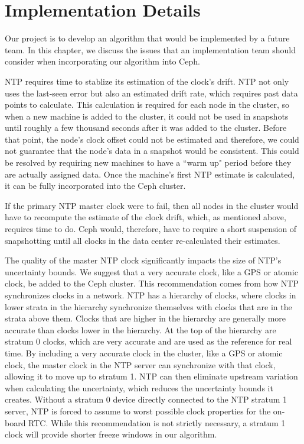 \chapter{Implementation Details}
\label{sec:impl}

Our project is to develop an algorithm that would be implemented by a future
team. In this chapter, we discuss the issues that an implementation 
team should consider when incorporating our algorithm into Ceph.

NTP requires time to stablize its estimation of the clock's drift. 
NTP not only uses the last-seen error but also an estimated
drift rate, which requires past data points to calculate. This calculation 
is required for each node in the cluster, so when a new machine is
added to the cluster, it could not be used in snapshots until
roughly a few thousand seconds after it was added to the
cluster. Before that point, the node's clock offset could not be estimated and therefore, we could not guarantee that the node's data in a snapshot would be consistent. This could be resolved by requiring new machines to have a ``warm
up" period before they are actually assigned data. Once the machine's
first NTP estimate is calculated, it can be fully incorporated into the Ceph cluster.

If the primary NTP master clock were to fail, then all nodes in the cluster would have to recompute the estimate of the clock drift, which, as mentioned above, requires time to do. Ceph would, therefore, have to require a
short suspension of snapshotting until all clocks in the data center re-calculated their estimates.

The quality of the master NTP clock significantly impacts the size of NTP's
uncertainty bounds. We suggest that a very accurate clock, like a GPS or atomic clock, be added to the Ceph cluster. This recommendation comes from how NTP synchronizes clocks in a network. NTP has a hierarchy of clocks, where clocks in lower strata in the hierarchy synchronize themselves with clocks that are in the strata above them. Clocks that are higher in the hierarchy are generally more accurate than clocks lower in the hierarchy. At the top of the hierarchy are stratum 0 clocks, which are very accurate and are used as the reference for real time. By including a very accurate clock in the cluster, like a GPS or atomic clock, the master clock in the NTP server can synchronize with that clock, allowing it to move up to stratum 1. NTP can then eliminate upstream variation when calculating the uncertainty, which reduces the uncertainty bounds it creates. Without a stratum 0 device directly connected to the NTP stratum 1 server, NTP is forced to assume to worst possible clock properties for the on-board RTC. While this recommendation is not strictly necessary, a stratum 1 clock will provide shorter freeze windows in our algorithm.

